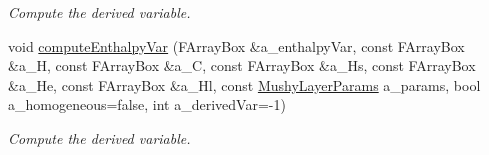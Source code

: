 \begin{DoxyCompactItemize}
\begin{DoxyCompactList}\small\item\em Compute the derived variable. \end{DoxyCompactList}\item 
\hypertarget{class_compute_enthalpy_vars_a47d69f5e0e29ad2477f6f070c3bd05f8}{void \hyperlink{class_compute_enthalpy_vars_a47d69f5e0e29ad2477f6f070c3bd05f8}{compute\-Enthalpy\-Var} (F\-Array\-Box \&a\-\_\-enthalpy\-Var, const F\-Array\-Box \&a\-\_\-\-H, const F\-Array\-Box \&a\-\_\-\-C, const F\-Array\-Box \&a\-\_\-\-Hs, const F\-Array\-Box \&a\-\_\-\-He, const F\-Array\-Box \&a\-\_\-\-Hl, const \hyperlink{class_mushy_layer_params}{Mushy\-Layer\-Params} a\-\_\-params, bool a\-\_\-homogeneous=false, int a\-\_\-derived\-Var=-\/1)}\label{class_compute_enthalpy_vars_a47d69f5e0e29ad2477f6f070c3bd05f8}

\begin{DoxyCompactList}\small\item\em Compute the derived variable. \end{DoxyCompactList}\end{DoxyCompactItemize}

